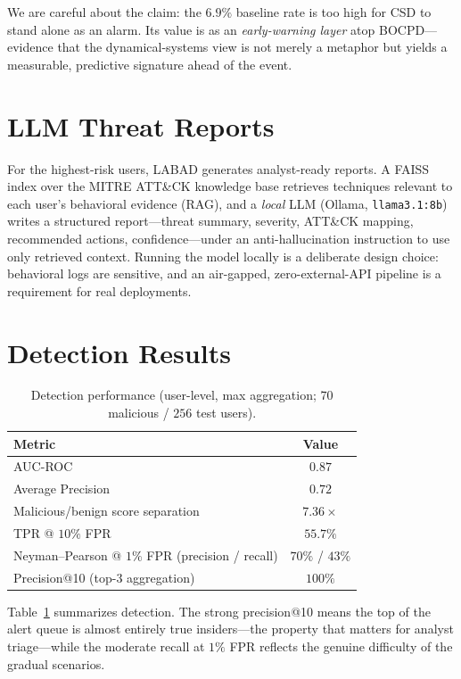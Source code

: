 \documentclass[11pt]{article}
\begin{document}
We are careful about the claim: the $6.9\%$ baseline rate is too high for CSD
to stand alone as an alarm. Its value is as an \emph{early-warning layer}
atop BOCPD---evidence that the dynamical-systems view is not merely a
metaphor but yields a measurable, predictive signature ahead of the event.

\section{LLM Threat Reports}

For the highest-risk users, LABAD generates analyst-ready reports. A FAISS
index over the MITRE ATT\&CK knowledge base retrieves techniques relevant
to each user's behavioral evidence (RAG), and a \emph{local} LLM
(Ollama, \texttt{llama3.1:8b}) writes a structured report---threat summary,
severity, ATT\&CK mapping, recommended actions, confidence---under an
anti-hallucination instruction to use only retrieved context. Running the
model locally is a deliberate design choice: behavioral logs are sensitive,
and an air-gapped, zero-external-API pipeline is a requirement for
real deployments.

\section{Detection Results}

\begin{table}[t]
  \centering
  \caption{Detection performance (user-level, max aggregation; $70$
  malicious / $256$ test users).}
  \label{tab:detection}
  \begin{tabular}{lc}
    \toprule
    Metric & Value \\
    \midrule
    AUC-ROC & $0.87$ \\
    Average Precision & $0.72$ \\
    Malicious/benign score separation & $7.36\times$ \\
    TPR @ $10\%$ FPR & $55.7\%$ \\
    Neyman--Pearson @ $1\%$ FPR (precision / recall) & $70\%$ / $43\%$ \\
    Precision@10 (top-$3$ aggregation) & $100\%$ \\
    \bottomrule
  \end{tabular}
\end{table}

Table~\ref{tab:detection} summarizes detection. The strong
precision@10 means the top of the alert queue is almost entirely true
insiders---the property that matters for analyst triage---while the
moderate recall at $1\%$ FPR reflects the genuine difficulty of the
gradual scenarios.
\end{document}
